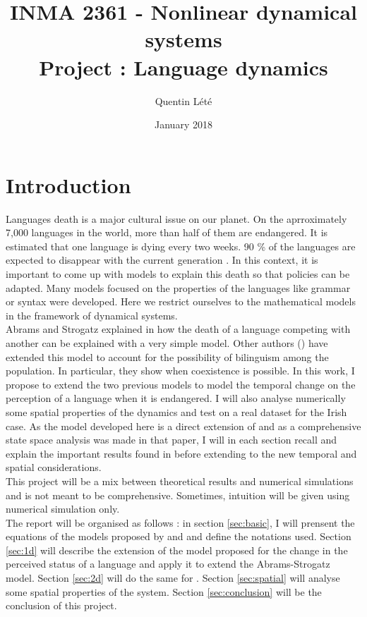 \documentclass{article}
\title{INMA 2361 - Nonlinear dynamical systems \\
        Project : Language dynamics}
\author{Quentin Lété}
\date{January 2018}
\begin{document}
\maketitle

\section{Introduction}
Languages death is a major cultural issue on our planet.
On the aprroximately 7,000 languages in the world, more than half of them are endangered.
It is estimated that one language is dying every two weeks.
90 \% of the languages are expected to disappear with the current generation \cite{death}.
In this context, it is important to come up with models to explain this death so that policies can be adapted.
Many models focused on the properties of the languages like grammar or syntax were developed.
Here we restrict ourselves to the mathematical models in the framework of dynamical systems. \\
Abrams and Strogatz explained in \cite{death} how the death of a language competing with another can be explained with a very simple model.
Other authors (\cite{bilingual}) have extended this model to account for the possibility of bilinguism among the population. In particular, they show when coexistence is possible.
In this work, I propose to extend the two previous models to model the temporal change on the perception of a language when it is endangered.
I will also analyse numerically some spatial properties of the dynamics and test on a real dataset for the Irish case.
As the model developed here is a direct extension of \cite{bilingual} and as a comprehensive state space analysis was made in that paper,
I will in each section recall and explain the important results found in \cite{bilingual} before extending to the new temporal and spatial considerations. \\
This project will be a mix between theoretical results and numerical simulations and is not meant to be comprehensive. Sometimes, intuition will be given using numerical simulation only. \\
The report will be organised as follows : in section \ref{sec:basic},
I will prensent the equations of the models proposed by \cite{death} and \cite{bilingual} and define the notations used.
Section \ref{sec:1d} will describe the extension of the model proposed for the change in the perceived status of a language and apply it to extend the Abrams-Strogatz model.
Section \ref{sec:2d} will do the same for \cite{bilingual}.
Section \ref{sec:spatial} will analyse some spatial properties of the system.
Section \ref{sec:conclusion} will be the conclusion of this project.
\end{document}
